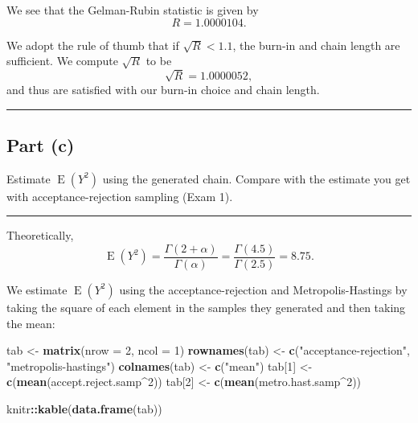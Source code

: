 \documentclass[
  11pt,
]{paper}
\newenvironment{Shaded}{\begin{snugshade}}{\end{snugshade}}
\newcommand{\AttributeTok}[1]{\textcolor[rgb]{0.13,0.29,0.53}{#1}}
\newcommand{\DecValTok}[1]{\textcolor[rgb]{0.00,0.00,0.81}{#1}}
\newcommand{\FunctionTok}[1]{\textcolor[rgb]{0.13,0.29,0.53}{\textbf{#1}}}
\newcommand{\NormalTok}[1]{#1}
\newcommand{\OtherTok}[1]{\textcolor[rgb]{0.56,0.35,0.01}{#1}}
\newcommand{\SpecialCharTok}[1]{\textcolor[rgb]{0.81,0.36,0.00}{\textbf{#1}}}
\newcommand{\StringTok}[1]{\textcolor[rgb]{0.31,0.60,0.02}{#1}}
\begin{document}
We see that the Gelman-Rubin statistic is given by \[
  R = 1.0000104.
\]

We adopt the rule of thumb that if \(\sqrt{R} < 1.1\), the burn-in and
chain length are sufficient. We compute \(\sqrt{R}\) to be \[
  \sqrt{R} = 1.0000052,
\] and thus are satisfied with our burn-in choice and chain length.

\begin{center}\rule{0.5\linewidth}{0.5pt}\end{center}

\hypertarget{part-c}{%
\subsection{Part (c)}\label{part-c}}

Estimate \(\operatorname{E}(Y^2)\) using the generated chain. Compare
with the estimate you get with acceptance-rejection sampling (Exam 1).

\begin{center}\rule{0.5\linewidth}{0.5pt}\end{center}

Theoretically, \[
  \operatorname{E}(Y^2) = \frac{\Gamma(2+\alpha)}{\Gamma(\alpha)} = \frac{\Gamma(4.5)}{\Gamma(2.5)} = 8.75.
\]

We estimate \(\operatorname{E}(Y^2)\) using the acceptance-rejection and
Metropolis-Hastings by taking the square of each element in the samples
they generated and then taking the mean:

\begin{Shaded}
\begin{Highlighting}[]
\NormalTok{tab }\OtherTok{\textless{}{-}} \FunctionTok{matrix}\NormalTok{(}\AttributeTok{nrow =} \DecValTok{2}\NormalTok{, }\AttributeTok{ncol =} \DecValTok{1}\NormalTok{)}
\FunctionTok{rownames}\NormalTok{(tab) }\OtherTok{\textless{}{-}} \FunctionTok{c}\NormalTok{(}\StringTok{"acceptance{-}rejection"}\NormalTok{, }\StringTok{"metropolis{-}hastings"}\NormalTok{)}
\FunctionTok{colnames}\NormalTok{(tab) }\OtherTok{\textless{}{-}} \FunctionTok{c}\NormalTok{(}\StringTok{"mean"}\NormalTok{)}
\NormalTok{tab[}\DecValTok{1}\NormalTok{] }\OtherTok{\textless{}{-}} \FunctionTok{c}\NormalTok{(}\FunctionTok{mean}\NormalTok{(accept.reject.samp}\SpecialCharTok{\^{}}\DecValTok{2}\NormalTok{))}
\NormalTok{tab[}\DecValTok{2}\NormalTok{] }\OtherTok{\textless{}{-}} \FunctionTok{c}\NormalTok{(}\FunctionTok{mean}\NormalTok{(metro.hast.samp}\SpecialCharTok{\^{}}\DecValTok{2}\NormalTok{))}

\NormalTok{knitr}\SpecialCharTok{::}\FunctionTok{kable}\NormalTok{(}\FunctionTok{data.frame}\NormalTok{(tab))}
\end{Highlighting}
\end{Shaded}
\end{document}
